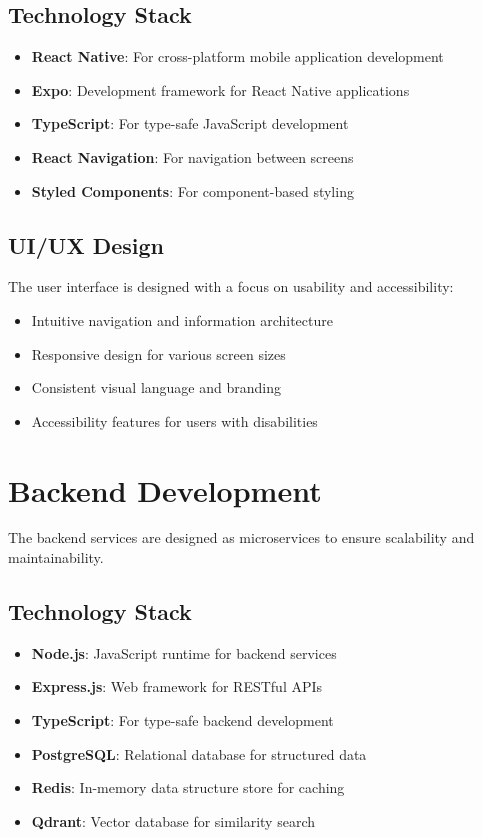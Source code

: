 \documentclass[12pt,a4paper]{report}
\begin{document}
\subsection{Technology Stack}
\begin{itemize}[leftmargin=2em]
  \item \textbf{React Native}: For cross-platform mobile application development
  \item \textbf{Expo}: Development framework for React Native applications
  \item \textbf{TypeScript}: For type-safe JavaScript development
  \item \textbf{React Navigation}: For navigation between screens
  \item \textbf{Styled Components}: For component-based styling
\end{itemize}

\subsection{UI/UX Design}
The user interface is designed with a focus on usability and accessibility:
\begin{itemize}[leftmargin=2em]
  \item Intuitive navigation and information architecture
  \item Responsive design for various screen sizes
  \item Consistent visual language and branding
  \item Accessibility features for users with disabilities
\end{itemize}

\section{Backend Development}
The backend services are designed as microservices to ensure scalability and maintainability.

\subsection{Technology Stack}
\begin{itemize}[leftmargin=2em]
  \item \textbf{Node.js}: JavaScript runtime for backend services
  \item \textbf{Express.js}: Web framework for RESTful APIs
  \item \textbf{TypeScript}: For type-safe backend development
  \item \textbf{PostgreSQL}: Relational database for structured data
  \item \textbf{Redis}: In-memory data structure store for caching
  \item \textbf{Qdrant}: Vector database for similarity search
\end{itemize}
\end{document}

